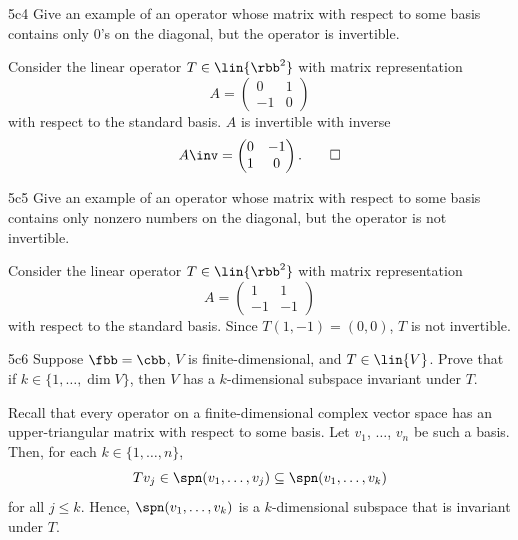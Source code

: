 \begin{exercise}{5c4}
    Give an example of an operator whose matrix with respect to some basis contains only $0$'s on the diagonal, but the operator is invertible.

\end{exercise}

\begin{sol}
    Consider the linear operator $T \in \lin{\rbb^2}$ with matrix representation
    \[
        A = 
        \begin{pmatrix}
            0 & 1 \\
            -1 & 0
        \end{pmatrix}
    \]
    with respect to the standard basis.
    $A$ is invertible with inverse
    \[
        A\inv = 
        \begin{pmatrix}
            0 & -1 \\
            1 & 0
        \end{pmatrix}. \qedhere
    \]
\end{sol}

\begin{exercise}{5c5}
    Give an example of an operator whose matrix with respect to some basis contains only nonzero numbers on the diagonal, but the operator is not invertible.
\end{exercise}

\begin{sol}
    Consider the linear operator $T \in \lin{\rbb^2}$ with matrix representation
    \[
        A = 
        \begin{pmatrix}
            1 & 1 \\
            -1 & -1
        \end{pmatrix}
    \]
    with respect to the standard basis.
    Since $T(1, -1) = (0, 0)$, $T$ is not invertible.
\end{sol}

\begin{exercise}{5c6}
    Suppose $\fbb = \cbb$, $V$ is finite-dimensional, and $T \in \lin{V}$.
    Prove that if $k \in \{1, \ldots, \dim V\}$, then $V$ has a $k$-dimensional subspace invariant under $T$.
\end{exercise}

\begin{sol}
    Recall that every operator on a finite-dimensional complex vector space has an upper-triangular matrix with respect to some basis.
    Let $v_1$, $\dots$, $v_n$ be such a basis.
    Then, for each $k \in \{1, \dots, n\}$,
    \[
        Tv_j \in \spn(v_1, \dots, v_j) \subseteq \spn(v_1, \dots, v_k)
    \]
    for all $j \leq k$.
    Hence, $\spn(v_1, \dots, v_k)$ is a $k$-dimensional subspace that is invariant under $T$.
\end{sol}

